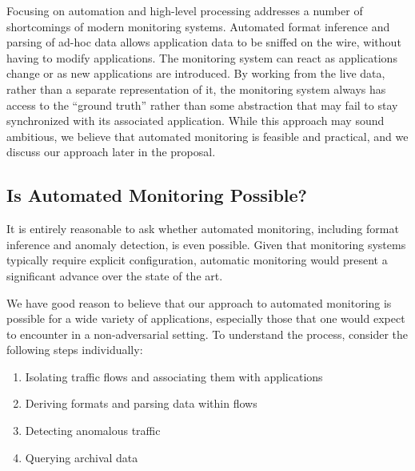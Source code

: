 Focusing on automation and high-level processing addresses a number of
shortcomings of modern monitoring systems. Automated format inference
and parsing of ad-hoc data allows application data to be sniffed on
the wire, without having to modify applications. The monitoring system
can react as applications change or as new applications are
introduced. By working from the live data, rather than a separate
representation of it, the monitoring system always has access to the
``ground truth'' rather than some abstraction that may fail to stay
synchronized with its associated application.  While this approach may
sound ambitious, we believe that automated monitoring is feasible and
practical, and we discuss our approach later in the proposal.

\subsection{Is Automated Monitoring Possible?}

It is entirely reasonable to ask whether automated monitoring,
including format inference and anomaly detection, is even
possible. Given that monitoring systems typically require explicit
configuration, automatic monitoring would present a significant
advance over the state of the art.

We have good reason to believe that our approach to automated
monitoring is possible for a wide variety of applications, especially
those that one would expect to encounter in a non-adversarial setting.
To understand the process, consider the following steps individually:

\begin{enumerate}
\item Isolating traffic flows and associating them with applications
\item Deriving formats and parsing data within flows
\item Detecting anomalous traffic
\item Querying archival data
\end{enumerate}

